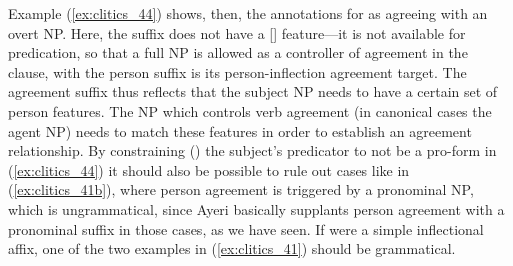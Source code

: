 Example (\ref{ex:clitics_44}) shows, then, the annotations for
 as agreeing with an overt NP. Here, the suffix does
not have a [\Pred{}] feature---it is not available for predication, so that a
full NP is allowed as a controller of agreement in the clause, with the person
suffix is its person-inflection agreement target. The agreement suffix
 thus reflects that the subject NP needs to have a certain set of
person features. The NP which controls verb agreement (in canonical cases the
agent NP) needs to match these features in order to establish an agreement
relationship. By constraining (\req{}) the subject's predicator to not be a
pro-form in (\ref{ex:clitics_44}) it should also be possible to rule out cases
like in (\ref{ex:clitics_41b}), where person agreement is triggered by a
pronominal NP, which is ungrammatical, since Ayeri basically supplants person
agreement with a pronominal suffix in those cases, as we have seen. If
 were a simple inflectional affix, one of the two examples 
in (\ref{ex:clitics_41}) should be grammatical.

\begin{morphlex}
\ex\label{ex:clitics_44}
\xe
\end{morphlex}

